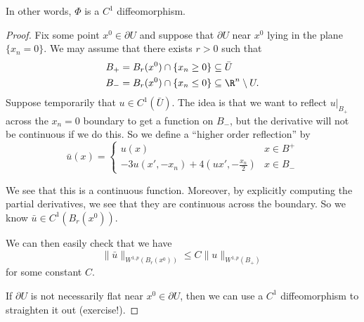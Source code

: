 \documentclass[a4paper]{article}
\begin{document}
In other words, $\Phi$ is a $C^1$ diffeomorphism.

\begin{proof}
  Fix some point $x^0 \in \partial U$ and suppose that $\partial U$ near $x^0$ lying in the plane $\{x_n = 0\}$. We may assume that there exists $r > 0$ such that
  \begin{align*}
    B_+ &= B_r(x^0) \cap \{x_n \geq 0\} \subseteq \bar{U}\\
    B_- &= B_r(x^0) \cap \{x_n \leq 0\} \subseteq \R^n \setminus U.
  \end{align*}
  Suppose temporarily that $u \in C^1(\bar{U})$. The idea is that we want to reflect $u|_{B_+}$ across the $x_n = 0$ boundary to get a function on $B_{-}$, but the derivative will not be continuous if we do this. So we define a ``higher order reflection'' by
  \[
    \bar{u}(x) =
    \begin{cases}
      u(x) & x \in B^+\\
      -3u(x', -x_n) + 4\left(u x', -\frac{x_n}{2}\right) & x \in B_-
    \end{cases}
  \]
  \begin{center}
  \end{center}
  We see that this is a continuous function. Moreover, by explicitly computing the partial derivatives, we see that they are continuous across the boundary. So we know $\bar{u} \in C^1(B_r(x^0))$.

  We can then easily check that we have
  \[
    \|\bar{u}\|_{W^{1, p}(B_r(x^0))} \leq C \|u\|_{W^{1, p}(B_+)}
  \]
  for some constant $C$.

  If $\partial U$ is not necessarily flat near $x^0 \in \partial U$, then we can use a $C^1$ diffeomorphism to straighten it out (exercise!).



\end{proof}
\end{document}
